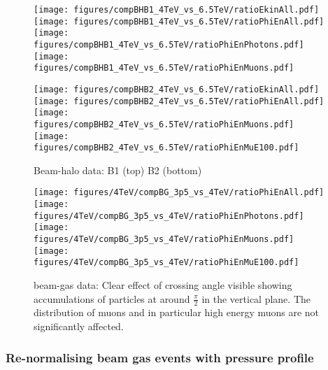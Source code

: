 \begin{figure}
\begin{center}
  \texttt{[image: figures/compBHB1\_4TeV\_vs\_6.5TeV/ratioEkinAll.pdf]}
  \texttt{[image: figures/compBHB1\_4TeV\_vs\_6.5TeV/ratioPhiEnAll.pdf]}
  \texttt{[image: figures/compBHB1\_4TeV\_vs\_6.5TeV/ratioPhiEnPhotons.pdf]}
  \texttt{[image: figures/compBHB1\_4TeV\_vs\_6.5TeV/ratioPhiEnMuons.pdf]}

  \texttt{[image: figures/compBHB2\_4TeV\_vs\_6.5TeV/ratioEkinAll.pdf]}
  \texttt{[image: figures/compBHB2\_4TeV\_vs\_6.5TeV/ratioPhiEnAll.pdf]}
  \texttt{[image: figures/compBHB2\_4TeV\_vs\_6.5TeV/ratioPhiEnMuons.pdf]}
  \texttt{[image: figures/compBHB2\_4TeV\_vs\_6.5TeV/ratioPhiEnMuE100.pdf]}
\end{center}
\vspace{-0.6cm}
 \caption{Beam-halo data: B1 (top) B2 (bottom)
  \label{valXingBH}}
\end{figure}



\begin{figure}
\begin{center}
  \texttt{[image: figures/4TeV/compBG\_3p5\_vs\_4TeV/ratioPhiEnAll.pdf]}
  \texttt{[image: figures/4TeV/compBG\_3p5\_vs\_4TeV/ratioPhiEnPhotons.pdf]}
  \texttt{[image: figures/4TeV/compBG\_3p5\_vs\_4TeV/ratioPhiEnMuons.pdf]}
  \texttt{[image: figures/4TeV/compBG\_3p5\_vs\_4TeV/ratioPhiEnMuE100.pdf]}
\end{center}
\vspace{-0.6cm}
 \caption{beam-gas data: Clear effect of crossing angle visible showing accumulations of particles at around $\frac{\pi}{2}$ in the vertical plane. The distribution of muons and in particular high energy muons are not significantly affected.
  \label{xingCompBG}}
\end{figure}

\subsubsection{Re-normalising beam gas events with pressure profile}

